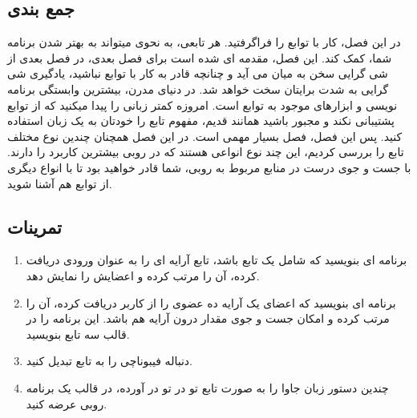 \documentclass[11pt]{article}
\begin{document}
\subsection{جمع بندی}
در این فصل، کار با توابع را فراگرفتید. هر تابعی، به نحوی میتواند به بهتر شدن برنامه شما، کمک کند. این فصل، مقدمه ای شده است برای فصل بعدی، در فصل بعدی از شی گرایی سخن به میان می آید و چنانچه قادر به کار با توابع نباشید، یادگیری شی گرایی به شدت برایتان سخت خواهد شد. در دنیای مدرن، بیشترین وابستگی برنامه نویسی و ابزارهای موجود به توابع است. امروزه کمتر زبانی را پیدا میکنید که از توابع پشتیبانی نکند و مجبور باشید همانند قدیم، مفهوم تابع را خودتان به یک زبان استفاده کنید. پس این فصل، فصل بسیار مهمی است. در این فصل همچنان چندین نوع مختلف تابع را بررسی کردیم، این چند نوع انواعی هستند که در روبی بیشترین کاربرد را دارند. با جست و جوی درست در منابع مربوط به روبی، شما قادر خواهید بود تا با انواع دیگری از توابع هم آشنا شوید. 
\subsection{تمرینات}
\begin{enumerate}
\item برنامه ای بنویسید که شامل یک تابع باشد، تابع آرایه ای را به عنوان ورودی دریافت کرده، آن را مرتب کرده و اعضایش را نمایش دهد. 
\item برنامه ای بنویسید که اعضای یک آرایه ده عضوی را از کاربر دریافت کرده، آن را مرتب کرده و امکان جست و جوی مقدار درون آرایه هم باشد. این برنامه را در قالب سه تابع بنویسید. 
\item دنباله فیبوناچی را به تابع تبدیل کنید. 
\item چندین دستور زبان جاوا را به صورت تابع تو در تو در آورده، در قالب یک برنامه روبی عرضه کنید. 
\end{enumerate}
\newpage{}
\end{document}
